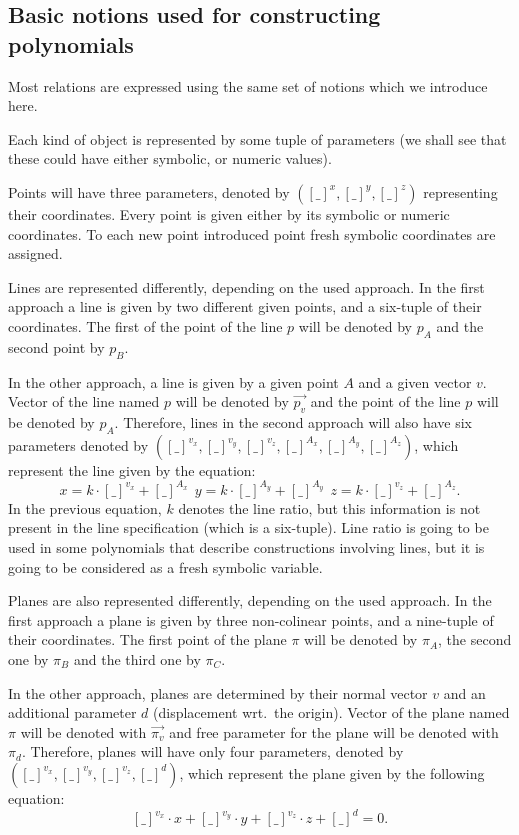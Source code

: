 \documentclass[final,1p,times,authoryear]{elsarticle}
\begin{document}
\subsection{Basic notions used for constructing polynomials}
Most relations are expressed using the same set of notions which we
introduce here.

Each kind of object is represented by some tuple of parameters (we
shall see that these could have either symbolic, or numeric values).

Points will have three parameters, denoted by
$({[\_]}^x, {[\_]}^y, {[\_]}^z)$ representing their coordinates. Every
point is given either by its symbolic or numeric coordinates. To each
new point introduced point fresh symbolic coordinates are assigned.

Lines are represented differently, depending on the used approach.  In
the first approach a line is given by two different given points, and
a six-tuple of their coordinates. The first of the point of the line
$p$ will be denoted by $p_A$ and the second point by $p_B$.

In the other approach, a line is given by a given point $A$ and a
given vector $v$. Vector of the line named $p$ will be denoted by
$\overrightarrow{p_v}$ and the point of the line $p$ will be denoted by
$p_A$. Therefore, lines in the second approach will also have six
parameters denoted by
$({[\_]}^{v_x}, {[\_]}^{v_y}, {[\_]}^{v_z}, {[\_]}^{A_x},
{[\_]}^{A_y}, {[\_]}^{A_z})$,
which represent the line given by the equation:
$$x = k\cdot[\_]^{v_x} + {[\_]}^{A_x}\ \ y = k\cdot[\_]^{A_y} +
{[\_]}^{A_y}\ \ z = k\cdot[\_]^{v_z} + {[\_]}^{A_z}.$$
In the previous equation, $k$ denotes the line ratio, but this
information is not present in the line specification (which is a
six-tuple). Line ratio is going to be used in some polynomials that
describe constructions involving lines, but it is going to be
considered as a fresh symbolic variable.

Planes are also represented differently, depending on the used
approach. In the first approach a plane is given by three non-colinear
points, and a nine-tuple of their coordinates. The first point of the
plane $\pi$ will be denoted by $\pi_A$, the second one by $\pi_B$ and
the third one by $\pi_C$.

In the other approach, planes are determined by their normal vector
$v$ and an additional parameter $d$ (displacement wrt.~the
origin). Vector of the plane named $\pi$ will be denoted with
$\overrightarrow{\pi_v}$ and free parameter for the plane will be
denoted with $\pi_d$. Therefore, planes will have only four
parameters, denoted by
$({[\_]}^{v_x}, {[\_]}^{v_y}, {[\_]}^{v_z}, {[\_]}^{d})$, which
represent the plane given by the following equation:
$${[\_]}^{v_x}\cdot x + {[\_]}^{v_y}\cdot y + {[\_]}^{v_z}\cdot z +
{[\_]}^{d} = 0.$$ 
\end{document}
